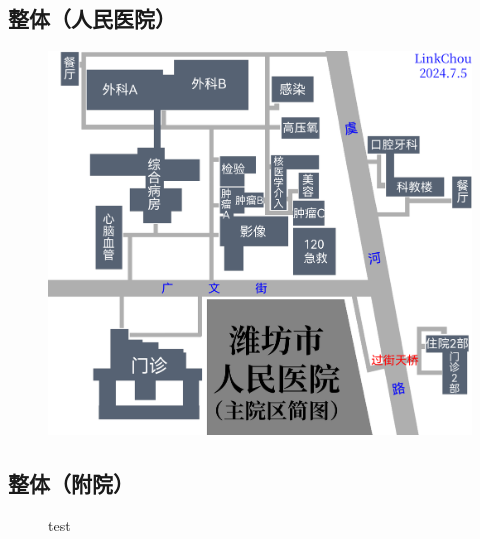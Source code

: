 \subsection[整体（人民医院）]{整体（人民医院）}
\begin{figure}[H]
    \centering
    \vspace{8em}
    \includegraphics*[width=\linewidth]{resources/map/人民医院.pdf}
    \label{map_yuhe_renmin_hospital}
\end{figure}

\newpage
\subsection[整体（附院）]{整体（附院）}
\begin{figure}[H]
    \centering
    test
\end{figure}

\newpage